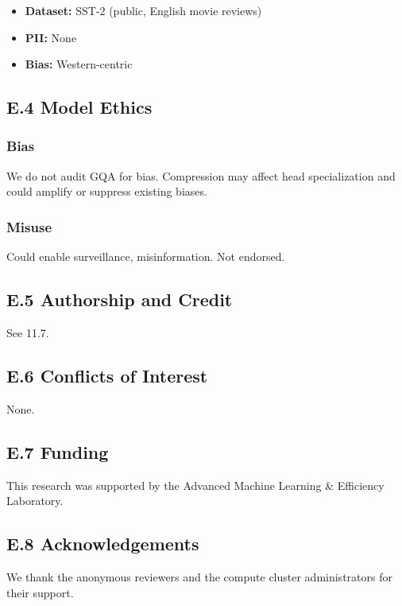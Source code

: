 \begin{itemize}
\item \textbf{Dataset:} SST-2 (public, English movie reviews)
\item \textbf{PII:} None
\item \textbf{Bias:} Western-centric

\end{itemize}
\subsection{E.4 Model Ethics}

\subsubsection{Bias}

We do not audit GQA for bias. Compression may affect head specialization 
and could amplify or suppress existing biases.

\subsubsection{Misuse}

Could enable surveillance, misinformation. Not endorsed.

\subsection{E.5 Authorship and Credit}

See  11.7.

\subsection{E.6 Conflicts of Interest}

None.

\subsection{E.7 Funding}

This research was supported by the Advanced Machine Learning & Efficiency Laboratory.

\subsection{E.8 Acknowledgements}

We thank the anonymous reviewers and the compute cluster administrators for their support.

